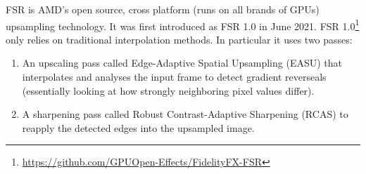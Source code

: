 \documentclass[letterpaper, 10 pt, conference]{ieeeconf}  %
\begin{document}
FSR is AMD's open source, cross platform (runs on all brands of GPUs) upsampling technology. It was first introduced as FSR 1.0 in June 2021.
FSR 1.0\footnote{\url{https://github.com/GPUOpen-Effects/FidelityFX-FSR}} only relies on traditional interpolation methods. In particular it uses two passes: 
\begin{enumerate}
    \item An upscaling pass called Edge-Adaptive Spatial Upsampling (EASU) that interpolates and analyses the input frame to detect gradient reverseals (essentially looking at how strongly neighboring pixel values differ). 
    \item A sharpening pass called Robust Contrast-Adaptive Sharpening (RCAS) to reapply the detected edges into the upsampled image. 
\end{enumerate}
\end{document}
